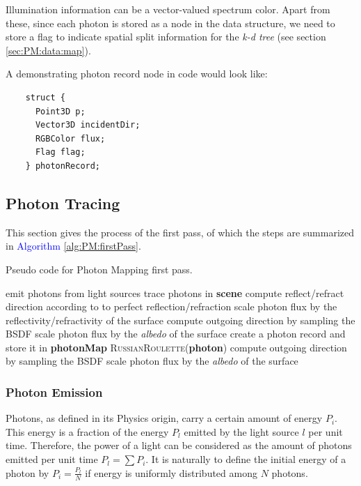 \documentclass[]{book}
\begin{document}
Illumination information can be a vector-valued spectrum color.
Apart from these, since each photon is stored as a node in the data structure, we need to store a flag to indicate spatial split information for the \textit{k-d tree} (see section \ref{sec:PM:data:map}).

A demonstrating photon record node in code would look like:
\begin{lstlisting}
	struct {
	  Point3D p;
	  Vector3D incidentDir;
	  RGBColor flux;
	  Flag flag;
	} photonRecord;
\end{lstlisting}

\subsection{Photon Tracing}
\label{sec:PM:data:photonTracing}
This section gives the process of the first pass, of which the steps are summarized in \textcolor{blue}{Algorithm \ref{alg:PM:firstPass}}.

\begin{algorithm}[t]
	\caption[Photon Mapping First Pass]{Pseudo code for Photon Mapping first pass.}
	\label{alg:PM:firstPass}
	\begin{algorithmic}[1]
		\State emit photons from light sources
		\State trace photons in \textbf{scene}
		\State compute reflect/refract direction according to to perfect reflection/refraction
		\State scale photon flux by the reflectivity/refractivity of the surface
		\State compute outgoing direction by sampling the BSDF
		\State scale photon flux by the \textit{albedo} of the surface
		\Else
		\State create a photon record and store it in \textbf{photonMap}
		\State \textsc{RussianRoulette}(\textbf{photon})
		\State compute outgoing direction by sampling the BSDF
		\State scale photon flux by the \textit{albedo} of the surface
		\EndIf
		\EndIf
		\EndFor
		\EndProcedure
	\end{algorithmic}
\end{algorithm}

\subsubsection*{Photon Emission}
Photons, as defined in its Physics origin, carry a certain amount of energy $P_i$.
This energy is a fraction of the energy $P_l$ emitted by the light source $l$ per unit time.
Therefore, the power of a light can be considered as the amount of photons emitted per unit time $P_l = \sum P_i$.
It is naturally to define the initial energy of a photon by $P_i = \frac{P_l}{N}$ if energy is uniformly distributed among $N$ photons.
\end{document}
